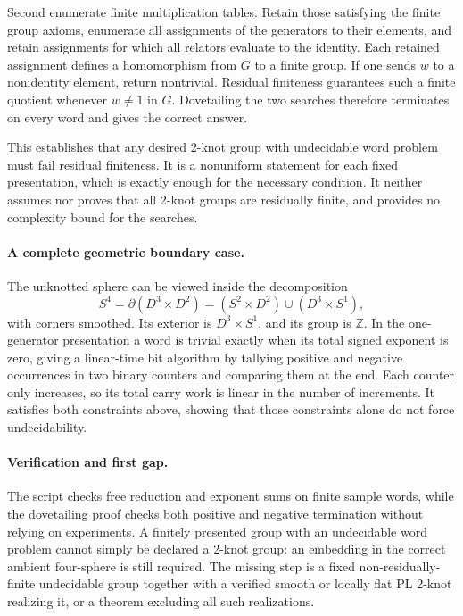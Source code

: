 \documentclass[11pt,a4paper]{article}
\begin{document}
Second enumerate finite multiplication tables. Retain those satisfying the finite group axioms, enumerate all assignments of the generators to their elements, and retain assignments for which all relators evaluate to the identity. Each retained assignment defines a homomorphism from $G$ to a finite group. If one sends $w$ to a nonidentity element, return nontrivial. Residual finiteness guarantees such a finite quotient whenever $w\ne1$ in $G$. Dovetailing the two searches therefore terminates on every word and gives the correct answer.

This establishes that any desired 2-knot group with undecidable word problem must fail residual finiteness. It is a nonuniform statement for each fixed presentation, which is exactly enough for the necessary condition. It neither assumes nor proves that all 2-knot groups are residually finite, and provides no complexity bound for the searches.

\paragraph{A complete geometric boundary case.}
The unknotted sphere can be viewed inside the decomposition
\[
 S^4=\partial(D^3\times D^2)
 =(S^2\times D^2)\cup(D^3\times S^1),
\]
with corners smoothed. Its exterior is $D^3\times S^1$, and its group is $\mathbb Z$. In the one-generator presentation a word is trivial exactly when its total signed exponent is zero, giving a linear-time bit algorithm by tallying positive and negative occurrences in two binary counters and comparing them at the end. Each counter only increases, so its total carry work is linear in the number of increments. It satisfies both constraints above, showing that those constraints alone do not force undecidability.

\paragraph{Verification and first gap.}
The script checks free reduction and exponent sums on finite sample words, while the dovetailing proof checks both positive and negative termination without relying on experiments. A finitely presented group with an undecidable word problem cannot simply be declared a 2-knot group: an embedding in the correct ambient four-sphere is still required. The missing step is a fixed non-residually-finite undecidable group together with a verified smooth or locally flat PL 2-knot realizing it, or a theorem excluding all such realizations.
\end{document}
